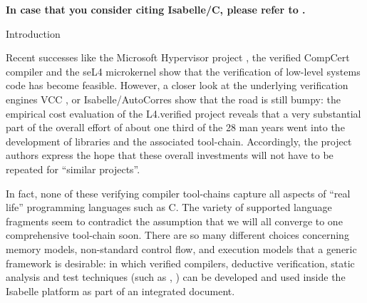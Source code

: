 \begin{isabellebody}
\begin{isamarkuptext*}
  \textbf{In case that you consider citing Isabelle/C, please refer to \cite{Tuong-IsabelleC:2019}.  } %
\end{isamarkuptext*}\isamarkuptrue%
%
\begin{isamarkupsection*}%
[label = {intro},type = {scholarly_paper.introduction}, args={label = {intro},type = {scholarly_paper.introduction}, Isa_COL.text_element.level = {}, Isa_COL.text_element.referentiable = {False}, Isa_COL.text_element.variants = {{STR ''outline'', STR ''document''}}, scholarly_paper.text_section.main_author = {}, scholarly_paper.text_section.fixme_list = {}, Isa_COL.text_element.level = {}}]Introduction%
\end{isamarkupsection*}\isamarkuptrue%
%
\begin{isamarkuptext*}%
[label = {introtext},type = {scholarly_paper.introduction}, args={label = {introtext},type = {scholarly_paper.introduction}, Isa_COL.text_element.level = {}, Isa_COL.text_element.referentiable = {False}, Isa_COL.text_element.variants = {{STR ''outline'', STR ''document''}}, scholarly_paper.text_section.main_author = {}, scholarly_paper.text_section.fixme_list = {}, Isa_COL.text_element.level = {}}]\noindent{}Recent successes like the Microsoft Hypervisor project \cite{DBLP:conf/fm/LeinenbachS09},
the verified CompCert compiler \cite{DBLP:journals/cacm/Leroy09}
and the seL4 microkernel \cite{DBLP:conf/sosp/KleinEHACDEEKNSTW09,DBLP:journals/tocs/KleinAEMSKH14} 
show that the verification of low-level systems code has become feasible.
However, a closer look at the underlying verification engines  
VCC \cite{DBLP:conf/tphol/CohenDHLMSST09}, 
or Isabelle/AutoCorres \cite{DBLP:conf/pldi/GreenawayLAK14}
show that the road is still bumpy: the  empirical cost evaluation  of the L4.verified project 
\cite{DBLP:journals/tocs/KleinAEMSKH14} reveals that a very substantial part  of the overall 
effort of about one third of the 28 man years went into the development of libraries and the 
associated tool-chain. Accordingly, the project authors \cite{DBLP:journals/tocs/KleinAEMSKH14} 
express the hope that these overall investments will not have to be repeated for 
``similar projects''.

In fact, none of these verifying compiler tool-chains capture all aspects of ``real life'' 
programming languages such as C. The variety of supported language fragments seem to contradict 
the assumption that we will all converge to one comprehensive tool-chain soon. There are so many 
different choices concerning memory models, non-standard control flow, and execution models 
that a generic framework is desirable: in which verified compilers, deductive verification, 
static analysis and test techniques (such as \cite{DBLP:conf/tap/Keller18}, 
\cite{DBLP:conf/itp/AissatVW16}) can be developed and used inside the Isabelle platform
as part of an integrated document.


\end{isamarkuptext*}
\end{isabellebody}
